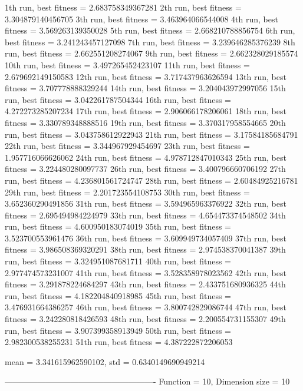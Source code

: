 1th run, best fitness = 2.683758349367281
2th run, best fitness = 3.304879140456705
3th run, best fitness = 3.463964066544008
4th run, best fitness = 3.569263139350028
5th run, best fitness = 2.668210788856754
6th run, best fitness = 3.241243457127098
7th run, best fitness = 3.239646285376239
8th run, best fitness = 2.662551208274067
9th run, best fitness = 2.662328029185574
10th run, best fitness = 3.497265452423107
11th run, best fitness = 2.679692149150583
12th run, best fitness = 3.717437963626594
13th run, best fitness = 3.707778888329244
14th run, best fitness = 3.204043972997056
15th run, best fitness = 3.042261787504344
16th run, best fitness = 4.272273285207234
17th run, best fitness = 2.906066178206061
18th run, best fitness = 3.330789348888516
19th run, best fitness = 3.370317958554665
20th run, best fitness = 3.043758612922943
21th run, best fitness = 3.17584185684791
22th run, best fitness = 3.344967929454697
23th run, best fitness = 1.957716066626062
24th run, best fitness = 4.978712847010343
25th run, best fitness = 3.224480280097737
26th run, best fitness = 3.400796660706192
27th run, best fitness = 4.236801561724747
28th run, best fitness = 2.60484925216781
29th run, best fitness = 2.201723554108753
30th run, best fitness = 3.652360290491856
31th run, best fitness = 3.594965963376922
32th run, best fitness = 2.695494984224979
33th run, best fitness = 4.654473374548502
34th run, best fitness = 4.600950183074019
35th run, best fitness = 3.523700553961476
36th run, best fitness = 3.609949734057409
37th run, best fitness = 3.986508369320291
38th run, best fitness = 2.974538370041387
39th run, best fitness = 3.324951087681711
40th run, best fitness = 2.977474573231007
41th run, best fitness = 3.528358978023562
42th run, best fitness = 3.291878224684297
43th run, best fitness = 2.433751680936325
44th run, best fitness = 4.182204840918985
45th run, best fitness = 3.476931664386257
46th run, best fitness = 3.800742829086744
47th run, best fitness = 3.242280818426593
48th run, best fitness = 2.200554731155307
49th run, best fitness = 3.907399358913949
50th run, best fitness = 2.982300538255231
51th run, best fitness = 4.387222872206053

mean = 3.341615962590102, std = 0.6340149690949214

-------------------------------------------------------
Function = 10, Dimension size = 10

